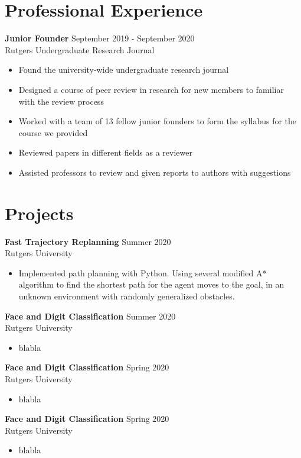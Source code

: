 \documentclass{article}
\begin{document}
\section{Professional Experience}
\textbf{Junior Founder}
\hfill{September 2019 - September 2020}\\
Rutgers Undergraduate Research Journal
\begin{itemize}
  \itemsep0em
  \item Found the university-wide undergraduate research journal
  \item Designed a course of peer review in research for new members to familiar with the
review process
  \item  Worked with a team of 13 fellow junior founders to form the syllabus for the course we
provided
  \item Reviewed papers in different fields as a reviewer
  \item Assisted professors to review and given reports to authors with suggestions
\end{itemize}


\section{Projects}
\textbf{Fast Trajectory Replanning}
\hfill{Summer 2020}\\
Rutgers University
\begin{itemize}
  \itemsep0em
  \item Implemented path planning with Python. Using several modified A* algorithm to find the shortest path for the agent moves to the goal, in an unknown environment with randomly generalized obstacles. 
\end{itemize}

\noindent \textbf{Face and Digit Classification}
\hfill{Summer 2020}\\
Rutgers University
\begin{itemize}
  \itemsep0em
  \item blabla
\end{itemize}

\noindent \textbf{Face and Digit Classification}
\hfill{Spring 2020}\\
Rutgers University
\begin{itemize}
  \itemsep0em
  \item blabla
\end{itemize}

\noindent \textbf{Face and Digit Classification}
\hfill{Spring 2020}\\
Rutgers University
\begin{itemize}
  \itemsep0em
  \item blabla
\end{itemize}
\end{document}
